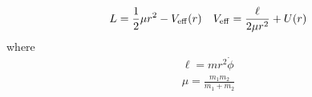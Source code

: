 

\vspace*{\fill}
\centering

\begin{align*}
    L = \frac{1}{2}\mu r^2 - V_{\rm eff}(r) \quad V_{\rm eff} = \frac{\ell}{2 \mu r^2} + U(r) 
\end{align*}
where
\begin{align*}
    \ell = mr^2 \dot{\phi} \\
    \mu = \frac{m_1 m_2}{m_1 + m_2}
\end{align*}
\centering
\vspace*{\fill}

